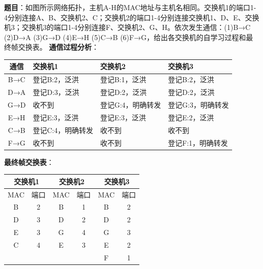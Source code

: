 \documentclass[12pt,a4paper,openany]{ctexbook}
\begin{document}
\begin{examplebox}
\textbf{题目}：如图所示网络拓扑，主机A-H的MAC地址与主机名相同。交换机1的端口1-4分别连接A、B、交换机2、C；交换机2的端口1-4分别连接交换机1、D、E、交换机3；交换机3的端口1-4分别连接F、交换机2、G、H。依次发生通信：(1)B→C (2)D→A (3)G→D (4)E→H (5)C→B (6)F→G，给出各交换机的自学习过程和最终帧交换表。
\tcblower
\textbf{通信过程分析}：

\begin{center}\small
\begin{tabular}{|c|l|l|l|}
\hline
\textbf{通信} & \textbf{交换机1} & \textbf{交换机2} & \textbf{交换机3} \\
\hline
B→C & 登记B:2，泛洪 & 登记B:1，泛洪 & 登记B:2，泛洪 \\
D→A & 登记D:3，泛洪 & 登记D:2，泛洪 & 登记D:2，泛洪 \\
G→D & 收不到 & 登记G:4，明确转发 & 登记G:3，明确转发 \\
E→H & 登记E:3，泛洪 & 登记E:3，泛洪 & 登记E:2，泛洪 \\
C→B & 登记C:4，明确转发 & 收不到 & 收不到 \\
F→G & 收不到 & 收不到 & 登记F:1，明确转发 \\
\hline
\end{tabular}
\end{center}

\textbf{最终帧交换表}：
\begin{center}\small
\begin{tabular}{|c|c||c|c||c|c|}
\hline
\multicolumn{2}{|c||}{\textbf{交换机1}} & \multicolumn{2}{c||}{\textbf{交换机2}} & \multicolumn{2}{c|}{\textbf{交换机3}} \\
\hline
MAC & 端口 & MAC & 端口 & MAC & 端口 \\
\hline
B & 2 & B & 1 & B & 2 \\
D & 3 & D & 2 & D & 2 \\
E & 3 & G & 4 & G & 3 \\
C & 4 & E & 3 & E & 2 \\
  &   &   &   & F & 1 \\
\hline
\end{tabular}
\end{center}
\end{examplebox}
\end{document}
